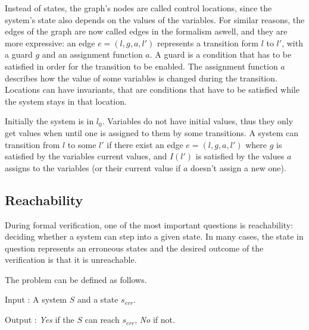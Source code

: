 Instead of states, the graph's nodes are called control locations, since the system's state also depends on the values of the variables. For similar reasons, the edges of the graph are now called edges in the formalism aswell, and they are more expressive: an edge $e=(l,g,a,l')$ represents a transition form $l$ to $l'$, with a guard $g$ and an assignment function $a$. A guard is a condition that has to be satisfied in order for the transition to be enabled. The assignment function $a$ describes how the value of some variables is changed during the transition. Locations can have invariants, that are conditions that have to be satisfied while the system stays in that location.

Initially the system is in $l_0$. Variables do not have initial values, thus they only get values when until one is assigned to them by some transitions. A system can transition from $l$ to some $l'$ if there exist an edge $e=(l,g,a,l')$ where $g$ is satisfied by the variables current values, and $I(l')$ is satisfied by the values $a$ assigns to the variables (or their current value if $a$ doesn't assign a new one).



\subsection{Reachability}
During formal verification, one of the most important questions is reachability: deciding whether a system can step into a given state. In many cases, the state in question represents an erroneous states and the desired outcome of the verification is that it is unreachable.

The problem can be defined as follows.
\begin{descripton}
	\item[Input]: A system $S$ and a state $s_{err}$.
	\item[Output]: \emph{Yes} if the $S$ can reach $s_{err}$, \emph{No} if not.
\end{descripton}

